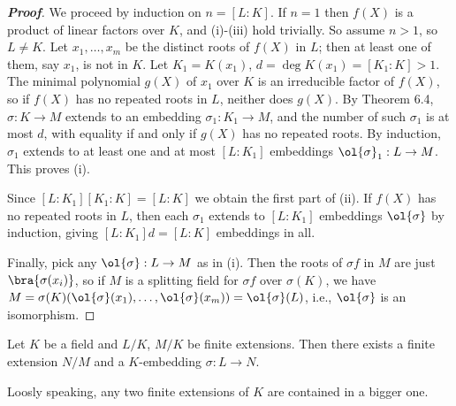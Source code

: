 \begin{proof}[\bf Proof]
We proceed by induction on $n = [L : K]$. If $n = 1$ then $f(X)$ is a product of linear factors over $K$, and (i)-(iii) hold trivially. So assume $n > 1$, so $L \neq K$. Let $x_1, \dots , x_m$ be the distinct roots of $f(X)$ in $L$; then at least one of them, say $x_1$, is not in $K$. Let $K_1 = K(x_1)$, $d = \deg K(x_1) = [K_1 : K] > 1$. The minimal polynomial $g(X)$ of $x_1$ over $K$ is an irreducible factor of $f(X)$, so if $f(X)$ has no repeated roots in $L$, neither does $g(X)$. By Theorem 6.4, $\sigma : K \to M$ extends to an embedding $\sigma_1 : K_1 \to M$, and the number of such $\sigma_1$ is at most $d$, with equality if and only if $g(X)$ has no repeated roots. By induction, $\sigma_1$ extends to at least one and at most $[L : K_1]$ embeddings $\ol{\sigma}_1 : L \to M$. This proves (i).

Since $[L : K_1][K_1 : K] = [L : K]$ we obtain the first part of (ii). If $f(X)$ has no repeated roots in $L$, then each $\sigma_1$ extends to $[L : K_1]$ embeddings $\ol{\sigma}$ by induction, giving $[L : K_1]d = [L : K]$ embeddings in all.

Finally, pick any $\ol{\sigma} : L \to M$ as in (i). Then the roots of $\sigma f$ in $M$ are just $\bra{\sigma(x_i)}$, so if $M$ is a splitting field for $\sigma f$ over $\sigma(K)$, we have $M = \sigma(K)(\ol{\sigma}(x_1), \dots , \ol{\sigma}(x_m)) = \ol{\sigma}(L)$, i.e., $\ol{\sigma}$ is an isomorphism.
\end{proof}


\begin{corollary}
Let $K$ be a field and $L/K$, $M/K$ be finite extensions. Then there exists a finite extension $N/M$ and a $K$-embedding $\sigma : L \to N$.

Loosly speaking, any two finite extensions of $K$ are contained in a bigger one.
\end{corollary}

